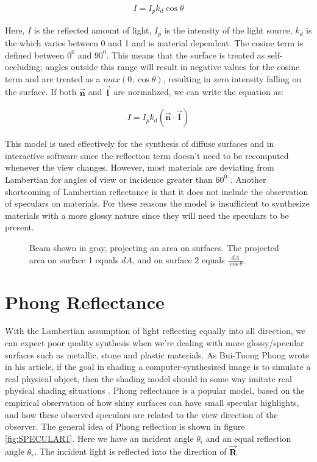 		\begin{eqnarray*}
			I = I_pk_d\cos\theta
		\end{eqnarray*}

Here, $I$ is the reflected amount of light, $I_p$ is the intensity of the light source, $k_d$ is the  which varies between 0 and 1 and is material dependent. The cosine term is defined between $0^0$ and $90^0$. This means that the surface is treated as self-occluding; angles outside this range will result in negative values for the cosine term and are treated as a $max({0,\cos\theta})$, resulting in zero intensity falling on the surface. If both $\vec{\mathbf{n}}$ and $\vec{\mathbf{l}}$ are normalized, we can write the equation as:

		\begin{eqnarray*}
			I = I_pk_d(\vec{\mathbf{n}} \cdot \vec{\mathbf{l}})
		\end{eqnarray*}

This model is used effectively for the synthesis of diffuse surfaces and in interactive software since the reflection term doesn't need to be recomputed whenever the view changes. However, most materials are deviating from Lambertian for angles of view or incidence greater than $60^0$ \cite{DigitalModeling}. Another shortcoming of Lambertian reflectance is that it does not include the observation of speculars on materials. For these reasons the model is insufficient to synthesize materials with a more glossy nature since they will need the speculars to be present. 


\begin{figure}[H]
	\begin{center}
	\end{center}
	\caption{Beam shown in gray, projecting an area on surfaces. The projected area on surface 1 equals $dA$, and on surface 2 equals $\frac{dA}{\cos\theta}$. }
	\label{fig:BEAM}
\end{figure}




	\section{Phong Reflectance}\label{Phong}
		With the Lambertian assumption of light reflecting equally into all direction, we can expect poor quality synthesis when we're dealing with more glossy/specular surfaces such as metallic, stone and plastic materials. As Bui-Tuong Phong wrote in his article, if the goal in shading a computer-synthesized image is to simulate a real physical object, then the shading model should in some way imitate real physical shading situations \cite{Phong}. Phong reflectance is a popular model, based on the empirical observation of how shiny surfaces can have small specular highlights, and how these observed speculars are related to the view direction of the observer.
The general idea of Phong reflection is shown in figure \ref{fig:SPECULAR1}. Here we have an incident angle $\theta_i$ and an equal reflection angle $\theta_r$. The incident light is reflected into the direction of $\vec{\mathbf{R}}$

